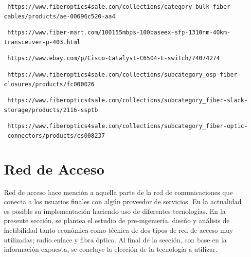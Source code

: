 \documentclass[12pt,a4paper]{book}
\begin{document}
\begin{enumerate}[{[1]}]
\item \label{cost_FO_trans} 
\begin{verbatim} https://www.fiberoptics4sale.com/collections/category_bulk-fiber-
cables/products/ae-00696c520-aa4 \end{verbatim} 
\item \label{cost_transceiver_trans}
\begin{verbatim} https://www.fiber-mart.com/100155mbps-100baseex-sfp-1310nm-40km-
transceiver-p-403.html \end{verbatim}
\item  \label{cost_switch_trans}
\begin{verbatim} https://www.ebay.com/p/Cisco-Catalyst-C6504-E-switch/74074274 \end{verbatim}
 \item  \label{cost_caja_empalme_trans}
\begin{verbatim} https://www.fiberoptics4sale.com/collections/subcategory_osp-fiber-
closures/products/fc000026 \end{verbatim}
\item  \label{cost_un_almac_trans}
 \begin{verbatim} https://www.fiberoptics4sale.com/collections/subcategory_fiber-slack-
storage/products/2116-ssptb \end{verbatim}
  
\item  \label{cost_conector_LC_trans}
 \begin{verbatim} https://www.fiberoptics4sale.com/collections/subcategory_fiber-optic-
 connectors/products/cs008237 \end{verbatim}

\end{enumerate}

\chapter{Red de Acceso}\label{cap_red_acceso}

Red de acceso hace mención a aquella parte de la red de comunicaciones que conecta a los usuarios finales con algún proveedor de servicios. En la actualidad es posible su implementación haciendo uso de diferentes tecnologías. En la presente sección, se plantea el estudio de pre-ingeniería, diseño y análisis de factibilidad tanto económica como técnica de dos tipos de red de acceso muy utilizadas; radio enlace y fibra óptica. Al final de la sección, con base en la información expuesta, se concluye la elección de la tecnología a utilizar.
\end{document}
